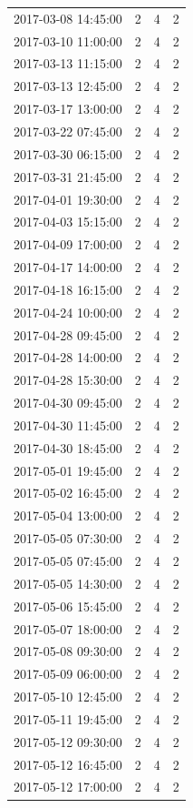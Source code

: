 \begin{tabular}{lrrr}
2017-03-08 14:45:00 & 2 & 4 & 2 \\
2017-03-10 11:00:00 & 2 & 4 & 2 \\
2017-03-13 11:15:00 & 2 & 4 & 2 \\
2017-03-13 12:45:00 & 2 & 4 & 2 \\
2017-03-17 13:00:00 & 2 & 4 & 2 \\
2017-03-22 07:45:00 & 2 & 4 & 2 \\
2017-03-30 06:15:00 & 2 & 4 & 2 \\
2017-03-31 21:45:00 & 2 & 4 & 2 \\
2017-04-01 19:30:00 & 2 & 4 & 2 \\
2017-04-03 15:15:00 & 2 & 4 & 2 \\
2017-04-09 17:00:00 & 2 & 4 & 2 \\
2017-04-17 14:00:00 & 2 & 4 & 2 \\
2017-04-18 16:15:00 & 2 & 4 & 2 \\
2017-04-24 10:00:00 & 2 & 4 & 2 \\
2017-04-28 09:45:00 & 2 & 4 & 2 \\
2017-04-28 14:00:00 & 2 & 4 & 2 \\
2017-04-28 15:30:00 & 2 & 4 & 2 \\
2017-04-30 09:45:00 & 2 & 4 & 2 \\
2017-04-30 11:45:00 & 2 & 4 & 2 \\
2017-04-30 18:45:00 & 2 & 4 & 2 \\
2017-05-01 19:45:00 & 2 & 4 & 2 \\
2017-05-02 16:45:00 & 2 & 4 & 2 \\
2017-05-04 13:00:00 & 2 & 4 & 2 \\
2017-05-05 07:30:00 & 2 & 4 & 2 \\
2017-05-05 07:45:00 & 2 & 4 & 2 \\
2017-05-05 14:30:00 & 2 & 4 & 2 \\
2017-05-06 15:45:00 & 2 & 4 & 2 \\
2017-05-07 18:00:00 & 2 & 4 & 2 \\
2017-05-08 09:30:00 & 2 & 4 & 2 \\
2017-05-09 06:00:00 & 2 & 4 & 2 \\
2017-05-10 12:45:00 & 2 & 4 & 2 \\
2017-05-11 19:45:00 & 2 & 4 & 2 \\
2017-05-12 09:30:00 & 2 & 4 & 2 \\
2017-05-12 16:45:00 & 2 & 4 & 2 \\
2017-05-12 17:00:00 & 2 & 4 & 2 \\

\end{tabular}
